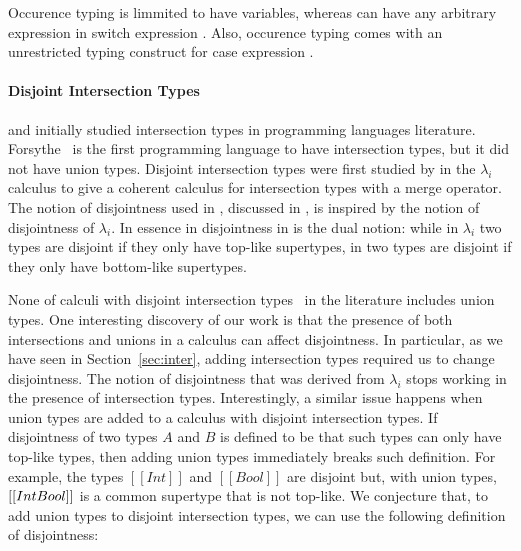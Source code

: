 Occurence typing is limmited to have variables, whereas \cal
can have any arbitrary expression in switch expression
.
Also, occurence typing comes with an
unrestricted typing construct for case expression
.

\paragraph{Disjoint Intersection Types}
\citet{pottinger1980type} and \citet{coppo1981functional} initially
studied intersection types in programming languages
literature. Forsythe~\cite{reynolds1988preliminary} is the first 
programming language to have intersection types, but it did not
have union types.  Disjoint intersection types were first
studied by \citet{oliveira2016disjoint} in the $\lambda_{i}$ calculus
to give a coherent calculus for intersection types with a merge
operator. The notion of disjointness used in \cal, discussed in ,
is inspired by the notion of disjointness of $\lambda_{i}$. In essence in
disjointness in \cal is the dual notion: while in $\lambda_{i}$ two types
are disjoint if they only have top-like supertypes, in \cal two types
are disjoint if they only have bottom-like supertypes.

None of calculi with disjoint intersection types~\cite{} in the literature
includes union types. One interesting discovery of our work is that the
presence of both intersections and unions in a calculus can affect disjointness.
In particular, as we have seen in Section~\ref{sec:inter}, adding intersection types
required us to change disjointness. The notion of disjointness that was
derived from $\lambda_{i}$ stops working in the presence of intersection types.
Interestingly, a similar issue happens when union types are added to
a calculus with disjoint intersection types. If disjointness of two types $A$
and $B$ is defined to be that such types can only have top-like types,
then adding union types immediately breaks such definition.
For example, the types $[[Int]]$ and $[[Bool]]$ are disjoint but, with union
types, $[[Int \/ Bool]]$ is a common supertype that is not top-like.
We conjecture that, to add union types to disjoint intersection types,
we can use the following definition of disjointness:

